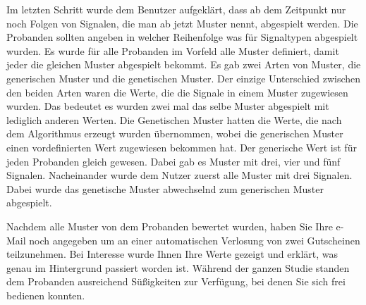 Im letzten Schritt wurde dem Benutzer aufgekl{\"a}rt, dass ab dem Zeitpunkt nur noch Folgen von Signalen, die man ab jetzt Muster nennt, abgespielt werden. Die Probanden sollten angeben in welcher Reihenfolge was f{\"u}r Signaltypen abgespielt wurden. Es wurde f{\"u}r alle Probanden im Vorfeld alle Muster definiert, damit jeder die gleichen Muster abgespielt bekommt. Es gab zwei Arten von Muster, die generischen Muster und die genetischen Muster. Der einzige Unterschied zwischen den beiden Arten waren die Werte, die die Signale in einem Muster zugewiesen wurden. Das bedeutet es wurden zwei mal das selbe Muster abgespielt mit lediglich anderen Werten. Die Genetischen Muster hatten die Werte, die nach dem Algorithmus erzeugt wurden {\"u}bernommen, wobei die generischen Muster einen vordefinierten Wert zugewiesen bekommen hat. Der generische Wert ist f{\"u}r jeden Probanden gleich gewesen.
Dabei gab es Muster mit drei, vier und f{\"u}nf Signalen. Nacheinander wurde dem Nutzer zuerst alle Muster mit drei Signalen. Dabei wurde das genetische Muster abwechselnd zum generischen Muster abgespielt. 

Nachdem alle Muster von dem Probanden bewertet wurden, haben Sie Ihre e-Mail noch angegeben um an einer automatischen Verlosung von zwei Gutscheinen teilzunehmen. Bei Interesse wurde Ihnen Ihre Werte gezeigt und erkl{\"a}rt, was genau im Hintergrund passiert worden ist. W{\"a}hrend der ganzen Studie standen dem Probanden ausreichend S{\"u}{\ss}igkeiten zur Verf{\"u}gung, bei denen Sie sich frei bedienen konnten.

